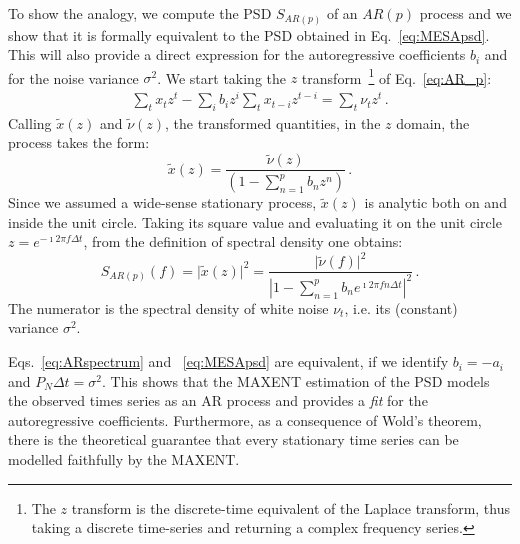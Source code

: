 \documentclass[epj,nopacs]{svjour}
\begin{document}
To show the analogy, we compute the PSD $S_{AR(p)}$ of an $AR(p)$ process and we show that it is formally equivalent to the PSD obtained in Eq.~\eqref{eq:MESApsd}. This will also provide a direct expression for the autoregressive coefficients $b_i$ and for the noise variance $\sigma^2$.
We start taking the $z$ transform~\footnote{The $z$ transform is the discrete-time equivalent of the Laplace transform, thus taking a discrete time-series and returning a complex frequency series.} of Eq.~\eqref{eq:AR_p}: 
\begin{align}
    \sum_t x_t z^t - \sum_i b_i z^i\sum_t x_{t - i} z^{t - i} = \sum_t \nu_t z^t\,.
\end{align}
Calling $\tilde x(z)$ and $\tilde \nu (z)$, the transformed quantities, 
in the $z$ domain, the process takes the form:
\begin{equation}
    \tilde x(z) = \frac{\tilde\nu(z)}{\left(1 - \sum_{n = 1}^p b_n z^n \right)}\,.
\end{equation}
Since we assumed a wide-sense stationary process, $\tilde{x}(z)$ is analytic both on and inside the unit circle. Taking its square value and evaluating it on the unit circle $z = e^{-\imath 2 \pi f \Delta t}$, from the definition of spectral density one obtains:
\begin{equation}\label{eq:ARspectrum}
    S_{AR(p)}(f) = \vert \tilde x(z)\vert ^ 2 = 
    \frac{\vert \tilde \nu(f) \vert ^ 2}{\left\vert 1 - \sum_{n = 1}^p b_n e^{\imath 2 \pi f n \Delta t} \right\vert ^ 2}\,.
\end{equation}
The numerator is the spectral density of white noise $\nu_t$, i.e. its (constant) variance $\sigma^2$.

Eqs.~\eqref{eq:ARspectrum} and ~\eqref{eq:MESApsd} are equivalent, if we identify $b_i = - a_i$ and $P_N \Delta t= \sigma ^ 2$.
This shows that the MAXENT estimation of the PSD models the observed times series as an AR process and provides a {\it fit} for the autoregressive coefficients.
Furthermore, as a consequence of Wold's theorem, there is the theoretical guarantee that every stationary time series can be modelled faithfully by the MAXENT.
\end{document}
